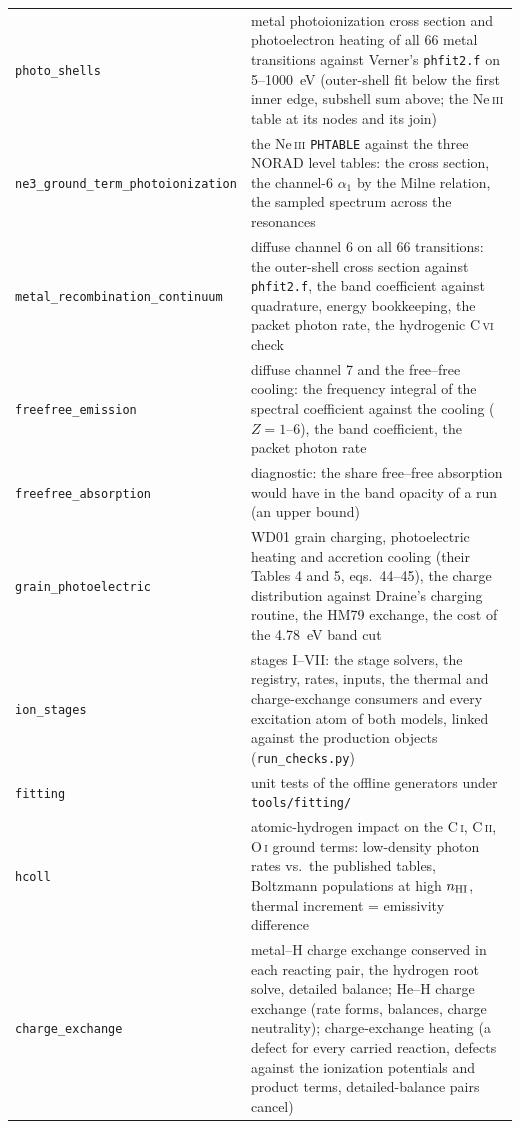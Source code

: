 \documentclass[english,a4paper]{my_memo}
\newcommand{\code}[1]{\texttt{#1}}
\begin{document}
{\begin{longtable}{lp{10.2cm}}
\code{photo\_shells} & metal photoionization cross section and photoelectron heating of all 66 metal transitions against Verner's \code{phfit2.f} on 5--1000~eV (outer-shell fit below the first inner edge, subshell sum above; the Ne\,\textsc{iii} table at its nodes and its join) \\
\code{ne3\_ground\_term\_photoionization} & the Ne\,\textsc{iii} \code{PHTABLE} against the three NORAD level tables: the cross section, the channel-6 $\alpha_1$ by the Milne relation, the sampled spectrum across the resonances \\
\code{metal\_recombination\_continuum} & diffuse channel 6 on all 66 transitions: the outer-shell cross section against \code{phfit2.f}, the band coefficient against quadrature, energy bookkeeping, the packet photon rate, the hydrogenic C\,\textsc{vi} check \\
\code{freefree\_emission} & diffuse channel 7 and the free--free cooling: the frequency integral of the spectral coefficient against the cooling ($Z = 1$--6), the band coefficient, the packet photon rate \\
\code{freefree\_absorption} & diagnostic: the share free--free absorption would have in the band opacity of a run (an upper bound) \\
\code{grain\_photoelectric} & WD01 grain charging, photoelectric heating and accretion cooling (their Tables 4 and 5, eqs.~44--45), the charge distribution against Draine's charging routine, the HM79 exchange, the cost of the 4.78~eV band cut \\
\code{ion\_stages} & stages I--VII: the stage solvers, the registry, rates, inputs, the thermal and charge-exchange consumers and every excitation atom of both models, linked against the production objects (\code{run\_checks.py}) \\
\code{fitting} & unit tests of the offline generators under \code{tools/fitting/} \\
\code{hcoll} & atomic-hydrogen impact on the C\,\textsc{i}, C\,\textsc{ii}, O\,\textsc{i} ground terms: low-density photon rates vs.\ the published tables, Boltzmann populations at high $n_{\rm HI}$, thermal increment = emissivity difference \\
\code{charge\_exchange} & metal--H charge exchange conserved in each reacting pair, the hydrogen root solve, detailed balance; He--H charge exchange (rate forms, balances, charge neutrality); charge-exchange heating (a defect for every carried reaction, defects against the ionization potentials and product terms, detailed-balance pairs cancel) \\

\end{longtable}}
\end{document}

